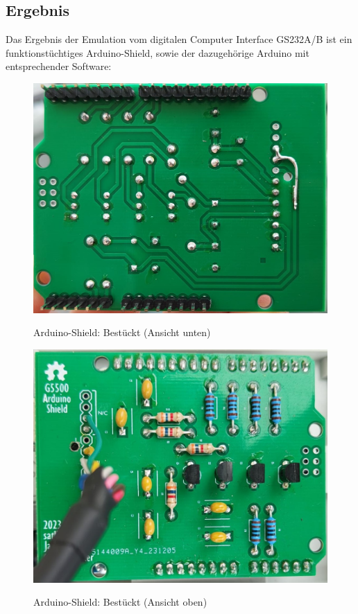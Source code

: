 \subsection{Ergebnis}
Das Ergebnis der Emulation vom digitalen Computer Interface GS232A/B ist ein funktionstüchtiges Arduino-Shield, sowie der dazugehörige Arduino mit entsprechender Software:
\begin{figure}[H]
	\begin{minipage}[b]{.4\linewidth} %
		\includegraphics[width=\linewidth]{../ref/PCB_Unten_GS232.jpeg}
		\label{fig:PCB_Arduino-Shield_unten_Bestueckt}
		\caption{Arduino-Shield: Bestückt (Ansicht unten)}
	\end{minipage}
	\hspace{.1\linewidth}%
	\begin{minipage}[b]{.4\linewidth} %
		\includegraphics[width=\linewidth]{../ref/PCB_Oben_02_GS232.jpeg}
		\label{fig:PCB_Arduino-Shield_oben_Bestueckt}
		\caption{Arduino-Shield: Bestückt (Ansicht oben)}
	\end{minipage}
\end{figure}

